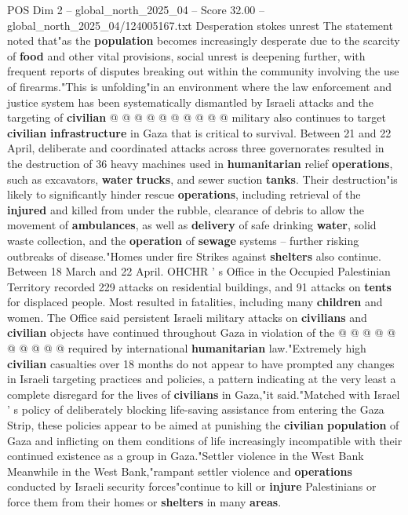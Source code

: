 \begin{textsample}{POS Dim 2 – global\_north\_2025\_04 – Score 32.00 – global\_north\_2025\_04/124005167.txt}
Desperation stokes unrest The statement noted that"as the \textbf{population} becomes increasingly desperate due to the scarcity of \textbf{food} and other vital provisions, social unrest is deepening further, with frequent reports of disputes breaking out within the community involving the use of firearms."This is unfolding"in an environment where the law enforcement and justice system has been systematically dismantled by Israeli attacks and the targeting of \textbf{civilian} @ @ @ @ @ @ @ @ @ @ military also continues to target \textbf{civilian} \textbf{infrastructure} in Gaza that is critical to survival.
Between 21 and 22 April, deliberate and coordinated attacks across three governorates resulted in the destruction of 36 heavy machines used in \textbf{humanitarian} relief \textbf{operations}, such as excavators, \textbf{water} \textbf{trucks}, and sewer suction \textbf{tanks}.
Their destruction"is likely to significantly hinder rescue \textbf{operations}, including retrieval of the \textbf{injured} and killed from under the rubble, clearance of debris to allow the movement of \textbf{ambulances}, as well as \textbf{delivery} of safe drinking \textbf{water}, solid waste collection, and the \textbf{operation} of \textbf{sewage} systems -- further risking outbreaks of disease."Homes under fire Strikes against \textbf{shelters} also continue.
Between 18 March and 22 April.
OHCHR ' s Office in the Occupied Palestinian Territory recorded 229 attacks on residential buildings, and 91 attacks on \textbf{tents} for displaced people.
Most resulted in fatalities, including many \textbf{children} and women.
The Office said persistent Israeli military attacks on \textbf{civilians} and \textbf{civilian} objects have continued throughout Gaza in violation of the @ @ @ @ @ @ @ @ @ @ required by international \textbf{humanitarian} law."Extremely high \textbf{civilian} casualties over 18 months do not appear to have prompted any changes in Israeli targeting practices and policies, a pattern indicating at the very least a complete disregard for the lives of \textbf{civilians} in Gaza,"it said."Matched with Israel ' s policy of deliberately blocking life-saving assistance from entering the Gaza Strip, these policies appear to be aimed at punishing the \textbf{civilian} \textbf{population} of Gaza and inflicting on them conditions of life increasingly incompatible with their continued existence as a group in Gaza."Settler violence in the West Bank Meanwhile in the West Bank,"rampant settler violence and \textbf{operations} conducted by Israeli security forces"continue to kill or \textbf{injure} Palestinians or force them from their homes or \textbf{shelters} in many \textbf{areas}.

\end{textsample}
